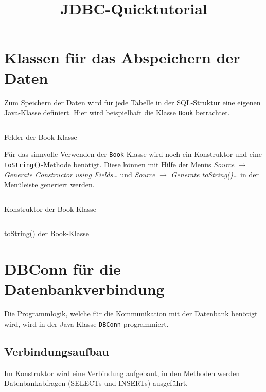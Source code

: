 \documentclass[11pt, DIV=14]{scrartcl}
\title{JDBC-Quicktutorial}
\date{}
\author{}
\let\java\texttt
\begin{document}
        \maketitle


        \section{Klassen für das Abspeichern der Daten}
        \label{sec:data}

        Zum Speichern der Daten wird für jede Tabelle in der SQL-Struktur eine eigenen Java-Klasse definiert.
        Hier wird beispielhaft die Klasse \java{Book} betrachtet.

        \begin{listing}[H]
            \inputminted[firstline=4, lastline=8, gobble=1]{java}{code/book.java}
            \caption{Felder der Book-Klasse}
        \end{listing}

        Für das sinnvolle Verwenden der \java{Book}-Klasse wird noch ein Konstruktor und eine \java{toString()}-Methode benötigt.
        Diese können mit Hilfe der Menüs \textit{Source} $ \rightarrow $ \textit{Generate Constructor using Fields\ldots} und \textit{Source} $ \rightarrow $ \textit{Generate toString()\ldots} in der Menüleiste generiert werden.

        \begin{listing}[H]
            \inputminted[firstline=10, lastline=16, gobble=1]{java}{code/book.java}
            \caption{Konstruktor der Book-Klasse}
        \end{listing}

        \begin{listing}[H]
            \inputminted[firstline=18, lastline=21, gobble=1]{java}{code/book.java}
            \caption{toString() der Book-Klasse}
        \end{listing}

        \section{DBConn für die Datenbankverbindung}
        Die Programmlogik, welche für die Kommunikation mit der Datenbank benötigt wird, wird in der Java-Klasse \java{DBConn} programmiert.

		\subsection{Verbindungsaufbau}
        Im Konstruktor wird eine Verbindung aufgebaut, in den Methoden werden Datenbankabfragen (SELECTs und INSERTs) ausgeführt.
\end{document}
